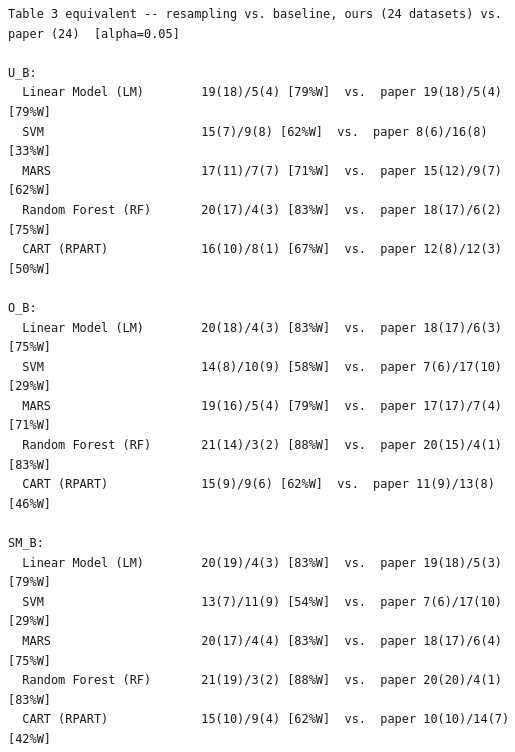 \begingroup
{}
\label{tab:exp002_cmp_cmp_table3}
\scriptsize
\begin{verbatim}
Table 3 equivalent -- resampling vs. baseline, ours (24 datasets) vs. paper (24)  [alpha=0.05]

U_B:
  Linear Model (LM)        19(18)/5(4) [79%W]  vs.  paper 19(18)/5(4) [79%W]
  SVM                      15(7)/9(8) [62%W]  vs.  paper 8(6)/16(8) [33%W]
  MARS                     17(11)/7(7) [71%W]  vs.  paper 15(12)/9(7) [62%W]
  Random Forest (RF)       20(17)/4(3) [83%W]  vs.  paper 18(17)/6(2) [75%W]
  CART (RPART)             16(10)/8(1) [67%W]  vs.  paper 12(8)/12(3) [50%W]

O_B:
  Linear Model (LM)        20(18)/4(3) [83%W]  vs.  paper 18(17)/6(3) [75%W]
  SVM                      14(8)/10(9) [58%W]  vs.  paper 7(6)/17(10) [29%W]
  MARS                     19(16)/5(4) [79%W]  vs.  paper 17(17)/7(4) [71%W]
  Random Forest (RF)       21(14)/3(2) [88%W]  vs.  paper 20(15)/4(1) [83%W]
  CART (RPART)             15(9)/9(6) [62%W]  vs.  paper 11(9)/13(8) [46%W]

SM_B:
  Linear Model (LM)        20(19)/4(3) [83%W]  vs.  paper 19(18)/5(3) [79%W]
  SVM                      13(7)/11(9) [54%W]  vs.  paper 7(6)/17(10) [29%W]
  MARS                     20(17)/4(4) [83%W]  vs.  paper 18(17)/6(4) [75%W]
  Random Forest (RF)       21(19)/3(2) [88%W]  vs.  paper 20(20)/4(1) [83%W]
  CART (RPART)             15(10)/9(4) [62%W]  vs.  paper 10(10)/14(7) [42%W]

\end{verbatim}
\endgroup
